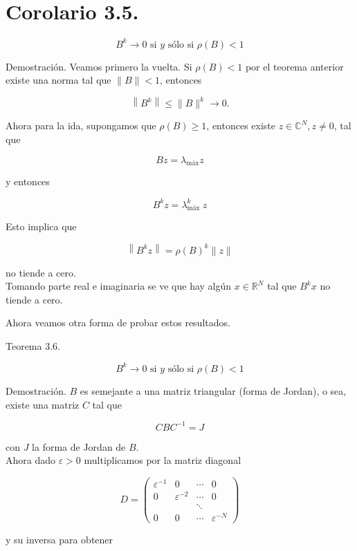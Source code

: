 \documentclass[10pt]{article}
\begin{document}
\section*{Corolario 3.5.}
$$
B^{k} \rightarrow 0 \text { si } y \text { sólo si } \rho(B)<1
$$

Demostración. Veamos primero la vuelta. Si $\rho(B)<1$ por el teorema anterior existe una norma tal que $\|B\|<1$, entonces

$$
\left\|B^{k}\right\| \leq\|B\|^{k} \rightarrow 0 .
$$

Ahora para la ida, supongamos que $\rho(B) \geq 1$, entonces existe $z \in \mathbb{C}^{N}, z \neq 0$, tal que

$$
B z=\lambda_{\operatorname{máx}} z
$$

y entonces

$$
B^{k} z=\lambda_{\text {máx }}^{k} z
$$

Esto implica que

$$
\left\|B^{k} z\right\|=\rho(B)^{k}\|z\|
$$

no tiende a cero.\\
Tomando parte real e imaginaria se ve que hay algún $x \in \mathbb{R}^{N}$ tal que $B^{k} x$ no tiende a cero.

Ahora veamos otra forma de probar estos resultados.

Teorema 3.6.

$$
B^{k} \rightarrow 0 \text { si } y \text { sólo si } \rho(B)<1
$$

Demostración. $B$ es semejante a una matriz triangular (forma de Jordan), o sea, existe una matriz $C$ tal que

$$
C B C^{-1}=J
$$

con $J$ la forma de Jordan de $B$.\\
Ahora dado $\varepsilon>0$ multiplicamos por la matriz diagonal

$$
D=\left(\begin{array}{cccc}
\varepsilon^{-1} & 0 & \cdots & 0 \\
0 & \varepsilon^{-2} & \cdots & 0 \\
& & \ddots & \\
0 & 0 & \cdots & \varepsilon^{-N}
\end{array}\right)
$$

y su inversa para obtener
\end{document}
